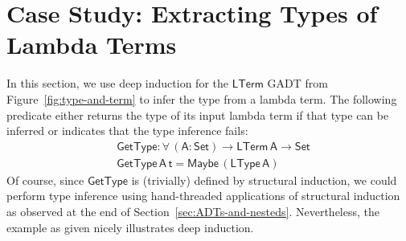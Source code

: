 \documentclass[sigplan,10pt]{acmart}
\begin{document}
\section{Case Study: Extracting Types of Lambda Terms}\label{sec:app}

In this section, we use deep induction for the $\mathsf{LTerm}$ GADT
from Figure~\ref{fig:type-and-term} to infer the type from a lambda
term. The following predicate either returns the type of its input
lambda term if that type can be inferred or indicates that the type
inference fails:
\begin{align*}
  &\mathsf{GetType : \forall \, (A : Set) \to LTerm\,A \to Set} \\
  &\mathsf{GetType \,A \,t = Maybe \, (LType \, A)}
\end{align*}
Of course, since $\mathsf{GetType}$ is (trivially) defined by
structural induction, we could perform type inference using
hand-threaded applications of structural induction as observed at the
end of Section~\ref{sec:ADTs-and-nesteds}. Nevertheless, the example
as given nicely illustrates deep induction.
\end{document}
